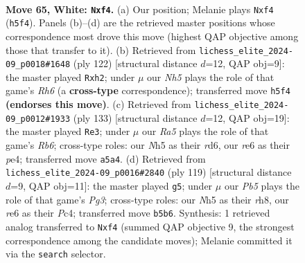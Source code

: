\documentclass[11pt]{article}
\begin{document}
\clearpage

\begin{figure}[p]\centering
\begin{subfigure}{0.46\textwidth}\centering
\resizebox{\linewidth}{!}{%
\newchessgame
\chessboard[
  setfen={8/1k6/4r3/RP5N/5p2/8/6P1/1K6 w - - 1 65},
  showmover=false,
  pgfstyle=straightmove, color=movearrow, markmove={h5-f4}
]}
\caption{}
\end{subfigure}\hfill
\begin{subfigure}{0.46\textwidth}\centering
\resizebox{\linewidth}{!}{%
\newchessgame
\chessboard[
  setfen={8/4k3/7R/1P1PK3/8/8/7p/2r5 w - - 1 62},
  showmover=false,
  pgfstyle=straightmove, color=movearrow, markmove={h6-h2}
]}
\caption{}
\end{subfigure}
\\[4pt]
\begin{subfigure}{0.46\textwidth}\centering
\resizebox{\linewidth}{!}{%
\newchessgame
\chessboard[
  setfen={8/8/3R1p2/1k2p3/4P2p/1r6/6K1/8 b - - 33 67},
  showmover=false,
  pgfstyle=straightmove, color=movearrow, markmove={b3-e3}
]}
\caption{}
\end{subfigure}\hfill
\begin{subfigure}{0.46\textwidth}\centering
\resizebox{\linewidth}{!}{%
\newchessgame
\chessboard[
  setfen={7R/8/4r1p1/8/2p4p/5K2/2k4P/8 b - - 5 60},
  showmover=false,
  pgfstyle=straightmove, color=movearrow, markmove={g6-g5}
]}
\caption{}
\end{subfigure}
\caption{\textbf{Move 65, White: \texttt{Nxf4}.} (a) Our position; Melanie plays \texttt{Nxf4} (\texttt{h5f4}). Panels (b)--(d) are the retrieved master positions whose correspondence most drove this move (highest QAP objective among those that transfer to it). (b) Retrieved from \texttt{lichess\_elite\_2024-09\_p0018\#1648} (ply 122) [structural distance $d$=12, QAP obj=9]: the master played \texttt{Rxh2}; under $\mu$ our \emph{Nh5} plays the role of that game's \emph{Rh6} (a \textbf{cross-type} correspondence); transferred move \texttt{h5f4} \textbf{(endorses this move)}. (c) Retrieved from \texttt{lichess\_elite\_2024-09\_p0012\#1933} (ply 133) [structural distance $d$=12, QAP obj=19]: the master played \texttt{Re3}; under $\mu$ our \emph{Ra5} plays the role of that game's \emph{Rb6}; cross-type roles: our \emph{N}h5 as their \emph{r}d6, our \emph{r}e6 as their \emph{p}e4; transferred move \texttt{a5a4}. (d) Retrieved from \texttt{lichess\_elite\_2024-09\_p0016\#2840} (ply 119) [structural distance $d$=9, QAP obj=11]: the master played \texttt{g5}; under $\mu$ our \emph{Pb5} plays the role of that game's \emph{Pg3}; cross-type roles: our \emph{N}h5 as their \emph{r}h8, our \emph{r}e6 as their \emph{P}c4; transferred move \texttt{b5b6}. Synthesis: 1 retrieved analog transferred to \texttt{Nxf4} (summed QAP objective 9, the strongest correspondence among the candidate moves); Melanie committed it via the \texttt{search} selector.}
\label{fig:thought-m128}
\end{figure}
\end{document}
